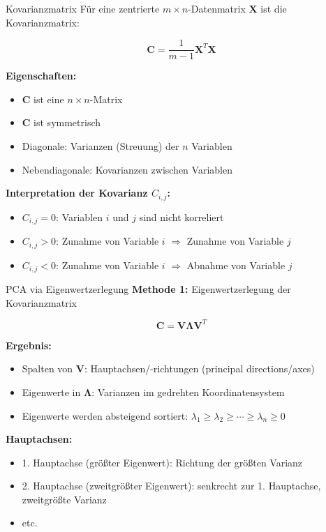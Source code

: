 \documentclass[a4paper, fontsize=7pt]{scrartcl}
\begin{document}
\begin{mainbox}{Kovarianzmatrix}
Für eine zentrierte $m \times n$-Datenmatrix $\mathbf{X}$ ist die Kovarianzmatrix:

$$\mathbf{C} = \frac{1}{m-1}\mathbf{X}^T\mathbf{X}$$

\textbf{Eigenschaften:}
\begin{itemize}
    \item $\mathbf{C}$ ist eine $n \times n$-Matrix
    \item $\mathbf{C}$ ist symmetrisch
    \item Diagonale: Varianzen (Streuung) der $n$ Variablen
    \item Nebendiagonale: Kovarianzen zwischen Variablen
\end{itemize}

\textbf{Interpretation der Kovarianz $C_{i,j}$:}
\begin{itemize}
    \item $C_{i,j} = 0$: Variablen $i$ und $j$ sind nicht korreliert
    \item $C_{i,j} > 0$: Zunahme von Variable $i$ $\Rightarrow$ Zunahme von Variable $j$
    \item $C_{i,j} < 0$: Zunahme von Variable $i$ $\Rightarrow$ Abnahme von Variable $j$
\end{itemize}
\end{mainbox}

\begin{mainbox}{PCA via Eigenwertzerlegung}
\textbf{Methode 1:} Eigenwertzerlegung der Kovarianzmatrix

$$\mathbf{C} = \mathbf{V\Lambda V}^T$$

\textbf{Ergebnis:}
\begin{itemize}
    \item Spalten von $\mathbf{V}$: Hauptachsen/-richtungen (principal directions/axes)
    \item Eigenwerte in $\mathbf{\Lambda}$: Varianzen im gedrehten Koordinatensystem
    \item Eigenwerte werden absteigend sortiert: $\lambda_1 \geq \lambda_2 \geq \cdots \geq \lambda_n \geq 0$
\end{itemize}

\textbf{Hauptachsen:}
\begin{itemize}
    \item 1. Hauptachse (größter Eigenwert): Richtung der größten Varianz
    \item 2. Hauptachse (zweitgrößter Eigenwert): senkrecht zur 1. Hauptachse, zweitgrößte Varianz
    \item etc.
\end{itemize}
\end{mainbox}
\end{document}
